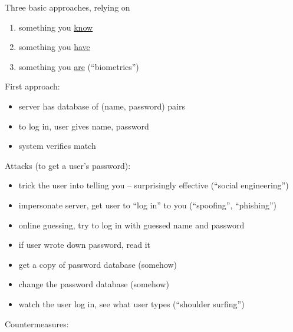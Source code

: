 Three basic approaches, relying on
\begin{enumerate}
    \item something you \underline{know}
    \item something you \underline{have}
    \item something you \underline{are} (``biometrics'')
\end{enumerate}
First approach:
\begin{itemize}
    \item server has database of (name, password) pairs
    \item to log in, user gives name, password
    \item system verifies match
\end{itemize}
Attacks (to get a user's password):
\begin{itemize}
    \item trick the user into telling you -- surprisingly effective (``social
            engineering'')
    \item impersonate server, get user to ``log in'' to you (``spoofing'',
            ``phishing'')
    \item online guessing, try to log in with guessed name and password
    \item if user wrote down password, read it
    \item get a copy of password database (somehow)
    \item change the password database (somehow)
    \item watch the user log in, see what user types (``shoulder surfing'')
\end{itemize}
Countermeasures:
